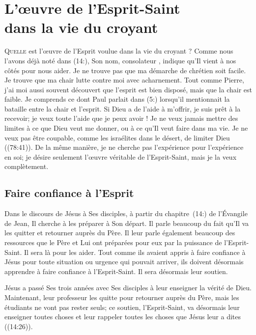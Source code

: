 \chapter[L'\oe{}uvre de l'Esprit-Saint dans la vie du croyant]{L'\oe{}uvre de l'Esprit-Saint\\ dans la vie du croyant}
\renewcommand{\chaphead}{\textls[0]{L'\oe{}uvre de l'Esprit-Saint dans la vie du croyant}}

\lettrine{Q}{uelle} est l'œuvre de l'Esprit
 voulue dans la vie du croyant ?
 Comme nous l'avons déjà noté dans (14:), Son nom,
 \Og con\-so\-la\-teur \Fg{}, indique qu'Il vient à nos côtés pour nous aider.
 Je ne trouve pas que ma démarche de chrétien soit facile.
 Je trouve que ma chair lutte contre moi avec acharnement.
 Tout comme Pierre, j'ai moi aussi souvent découvert que l'esprit
 est bien disposé, mais que la chair est faible.
 Je comprends ce dont Paul parlait dans (5:) lorsqu'il
 mentionnait la bataille entre la chair et l'esprit.
 Si Dieu a de l'aide à m'offrir, je suis prêt à la recevoir;
 je veux toute l'aide que je peux avoir !
 Je ne veux jamais mettre des limites à ce que Dieu veut me donner,
 ou à ce qu'Il veut faire dans ma vie. Je ne veux pas être coupable,
 comme les israélites dans le désert,
 de limiter Dieu ((78:41)).
 De la même manière, je ne cherche pas l'expérience 
 pour l'expérience en soi; je désire seulement l'œuvre véritable
 de l'Esprit-Saint, mais je la veux complètement.

\section{Faire confiance \`a l'Esprit}

Dans le discours de Jésus à Ses disciples, à partir du chapitre~(14:)
 de l'Évangile de Jean, Il cherche à les préparer à Son départ.
 Il parle beaucoup du fait qu'Il va les quitter et retourner auprès du Père.
 Il leur parle également beaucoup des ressources que le Père et Lui
 ont préparées pour eux par la puissance de l'Esprit-Saint.
 Il sera là pour les aider. Tout comme ils avaient appris à faire confiance
 à Jésus pour toute situation ou urgence qui pouvait arriver,
 ils doivent désormais apprendre à faire confiance à l'Esprit-Saint.
 Il sera désormais leur soutien.

Jésus a passé Ses trois années avec Ses disciples à leur enseigner
 la vérité de Dieu. Maintenant, leur professeur les quitte pour retourner
 auprès du Père, mais les étudiants ne vont pas rester seuls;
 ce soutien, l'Esprit-Saint, va désormais leur enseigner toutes choses
 et leur rappeler toutes les choses que Jésus leur a dites
 ((14:26)).

